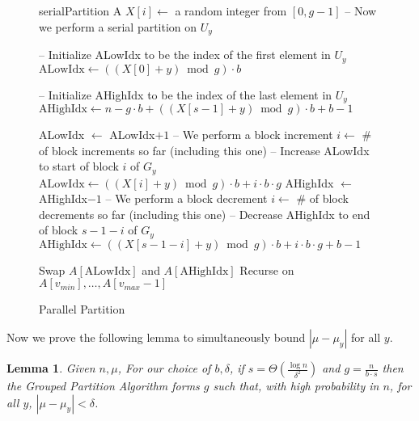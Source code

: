 \documentclass[twocolumn, twoside, 12pt]{article}
\newtheorem{lemma}{Lemma}
\begin{document}
\begin{figure*}
	\caption{Parallel Partition}
	\label{alg:parallelPartition}
	\begin{algorithmic}[1]
			\State serialPartition A
		\Else
				\State $X[i] \gets$ a random integer from $[0,g-1]$ 
			\EndFor
				\State -- Now we perform a serial partition on $U_y$

				\State -- Initialize ALowIdx to be the index of the first element in $U_y$
				\State $\text{ALowIdx} \gets ((X[0]+y) \bmod g)\cdot b$

				\State -- Initialize AHighIdx to be the index of the last element in $U_y$
				\State $\text{AHighIdx} \gets n - g\cdot b + ((X[s-1]+y) \bmod g)\cdot b + b-1$

						\State ALowIdx $\gets$ ALowIdx$+1$
							\State -- We perform a block increment
							\State $i \gets $ \# of block increments so far (including this one)
							\State -- Increase ALowIdx to start of block $i$ of $G_y$
							\State $\text{ALowIdx} \gets ((X[i] + y)\bmod g) \cdot b + i\cdot b\cdot g$
						\EndIf
					\EndWhile
						\State AHighIdx $\gets$ AHighIdx$-1$
							\State -- We perform a block decrement
							\State $i \gets $ \# of block decrements so far (including this one)
							\State -- Decrease AHighIdx to end of block $s-1-i$ of $G_y$
							\State $\text{AHighIdx} \gets ((X[s-1-i] + y)\bmod g) \cdot b + i\cdot b\cdot g + b - 1$
						\EndIf
					\EndWhile

					\State Swap $A[\text{ALowIdx}]$ and $A[\text{AHighIdx}]$
				\EndWhile
			\EndFor
			\State Recurse on $A[v_{min}],\ldots,A[v_{max}-1]$
		\EndIf
	\end{algorithmic}	
\end{figure*}

Now we prove the following lemma to simultaneously bound $|\mu - \mu_y|$ for all $y$. 
\begin{lemma}
Given $n, \mu$, For our choice of $b, \delta$, if $s=\Theta(\frac{\log n}{\delta^2})$ and $g = \frac{n}{b\cdot s}$ then the Grouped Partition Algorithm forms $g$ such that, with high probability in $n$, for all $y$, $|\mu - \mu_y| < \delta$.
\label{lem:groupedAlgDelta}
\end{lemma}
\end{document}
